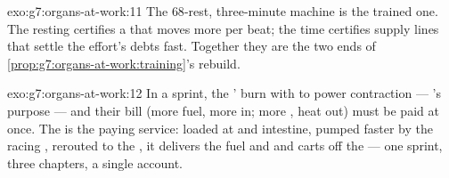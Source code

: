\begin{solution}{exo:g7:organs-at-work:11}
The $68$-rest, three-minute machine is the trained one.
The resting  certifies a  that moves more per
beat; the  time certifies supply lines that settle
the effort's debts fast. Together they are the two ends of
\cref{prop:g7:organs-at-work:training}'s rebuild.
\end{solution}

\begin{solution}{exo:g7:organs-at-work:12}
In a sprint, the  '  burn  with
 to power contraction --- 's purpose ---
and their bill (more fuel, more  in; more , heat out) must be paid at once. The  is the
paying service: loaded at  and intestine, pumped
faster by the racing , rerouted to the , it
delivers the fuel and  and carts off the  --- one sprint, three chapters, a single account.
\end{solution}

